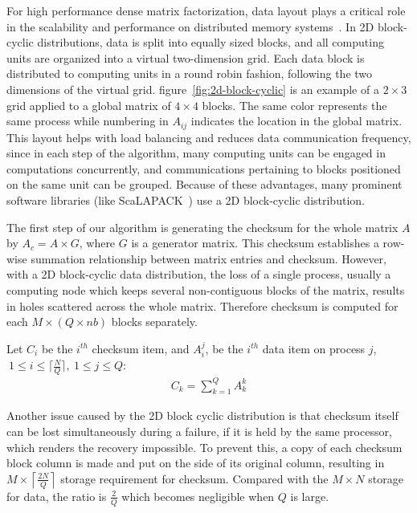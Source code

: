 For high performance dense matrix factorization, data layout plays a
critical role in the scalability and performance on distributed memory
systems~\cite{choi1996scalapack,kumar1994introduction}. In 2D
block-cyclic distributions, data is split into equally sized blocks,
and all computing units are organized into a virtual two-dimension
grid. Each data block is distributed to computing units in
a round robin fashion, following the two dimensions of the virtual
grid. figure~\ref{fig:2d-block-cyclic} is an example of a $2\times 3$
grid applied to a global matrix of $4 \times 4$ blocks. The same color
represents the same process while numbering in $A_{ij}$ indicates the
location in the global matrix. This layout helps with load balancing
and reduces data communication frequency, since in each step of the
algorithm, many computing units can be engaged in computations
concurrently, and communications pertaining to blocks positioned on
the same unit can be grouped. Because of these advantages, many
prominent software libraries (like
ScaLAPACK~\cite{dongarra1997scalapack}) use a 2D block-cyclic
distribution.

The first step of our algorithm is generating the checksum for the
whole matrix $A$ by $A_{c}=A\times G$, where $G$ is a generator
matrix. This checksum establishes a row-wise summation relationship
between matrix entries and checksum.  However, with a 2D block-cyclic
data distribution, the loss of a single process, usually a computing
node which keeps several non-contiguous blocks of the matrix, results
in holes scattered across the whole matrix. Therefore checksum is
computed for each $M\times (Q\times nb)$ blocks separately.

Let $C_{i}$ be the $i^{th}$ checksum item, and $A_{i}^{j}$, be the
$i^{th}$ data item on process $j$, $\ 1 \leq i \leq \lceil \frac{N}{Q}
\rceil,\ 1 \leq j \leq Q$:
\begin{eqnarray}
\label{eqn:checkpointing}
	C_{k} = \sum_{k=1}^{Q} A_{k}^{k}
\end{eqnarray}

Another issue caused by the 2D block cyclic distribution is that
checksum itself can be lost simultaneously during a failure, if it is
held by the same processor, which renders the \abft recovery
impossible.  To prevent this, a copy of each checksum block column is
made and put on the side of its original column, resulting in $M\times
\left \lceil \frac{2N}{Q} \right \rceil$ storage requirement for
checksum. Compared with the $M\times N$ storage for data, the ratio is
$\frac{2}{Q}$ which becomes negligible when $Q$ is large.

